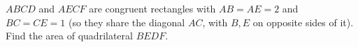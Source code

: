 $ABCD$ and $AECF$ are congruent rectangles with $AB=AE=2$ and $BC=CE=1$ (so they share the diagonal $AC$, with $B,E$ on opposite sides of it). Find the area of quadrilateral $BEDF$.
